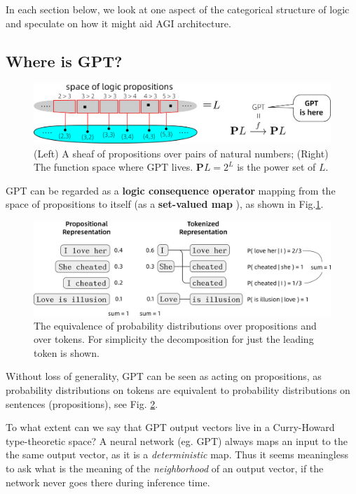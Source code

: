 \documentclass[runningheads]{llncs}
\begin{document}
In each section below, we look at one aspect of the categorical structure of logic and speculate on how it might aid AGI architecture.

\subsection{Where is GPT?}

\begin{figure}
	\includegraphics[scale=.5]{GPT-is-here.png}
	\caption{(Left) A sheaf of propositions over pairs of natural numbers; (Right) The function space where GPT lives. $\mathbf{P} L = 2^L$ is the power set of $L$.}
	\label{fig:GPT-is-here}
\end{figure}

GPT \cite{chatGPT2020} can be regarded as a \textbf{logic consequence operator} mapping from the space of propositions to itself (as a \textbf{set-valued map} \cite{Aubin1990}), as shown in Fig.\ref{fig:GPT-is-here}.

\begin{figure}
	\includegraphics[scale=.4]{I-love-her-she-is-bitch.png}	%
	\caption{The equivalence of probability distributions over propositions and over tokens. For simplicity the decomposition for just the leading token is shown.} \label{fig:she-is-bitch}
\end{figure}

Without loss of generality, GPT can be seen as acting on propositions, as probability distributions on tokens are equivalent to probability distributions on sentences (propositions), see Fig. \ref{fig:she-is-bitch}.

To what extent can we say that GPT output vectors live in a Curry-Howard type-theoretic space?  A neural network (eg. GPT) always maps an input to the the same output vector, as it is a \textit{deterministic} map. Thus it seems meaningless to ask what is the meaning of the \textit{neighborhood} of an output vector, if the network never goes there during inference time.
\end{document}
